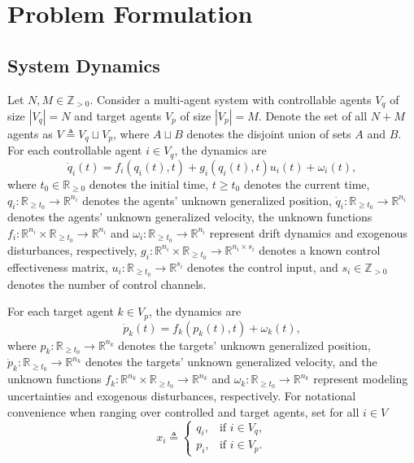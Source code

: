 \documentclass[letterpaper, 10 pt, conference]{ieeeconf}
\theoremstyle{definition}
\begin{document}
\section{Problem Formulation}

\subsection{System Dynamics}
Let $N,M\in\mathbb{Z}_{>0}$. Consider a multi-agent system with controllable agents $V_q$ of size $|V_q|=N$ and target agents $V_p$ of size $|V_p|=M$. Denote the set of all $N+M$ agents as $V\triangleq V_q\sqcup V_p$, where $A\sqcup B$ denotes the disjoint union of sets $A$ and $B$.
For each controllable agent $i\in V_q$, the dynamics are
\begin{equation}
\dot{q}_{i}(t)=f_{i}\left(q_{i}(t),t\right)+g_{i}\left(q_{i}(t),t\right)u_{i}\left(t\right)+\omega_{i}\left(t\right),\label{eq:Agent Dynamics}
\end{equation}
where $t_0\in\mathbb{R}_{\geq0}$ denotes the initial time, $t\geq t_0$ denotes the current time, $q_i:\mathbb{R}_{\geq t_0}\to\mathbb{R}^{n_i}$ denotes the agents' unknown generalized position, $\dot{q}_i:\mathbb{R}_{\geq t_0}\to\mathbb{R}^{n_i}$ denotes the agents' unknown generalized velocity, the unknown functions
$f_{i}:\mathbb{R}^{n_i}\times\mathbb{R}_{\geq t_0}\to\mathbb{R}^{n_i}$ and
$\omega_{i}:\mathbb{R}_{\geq t_0}\to\mathbb{R}^{n_i}$ represent drift dynamics and exogenous disturbances, respectively, $g_{i}:\mathbb{R}^{n_i}\times\mathbb{R}_{\geq t_0}\to\mathbb{R}^{n_i\times s_{i}}$ denotes a known control effectiveness matrix, $u_{i}:\mathbb{R}_{\geq t_0}\to\mathbb{R}^{s_{i}}$ denotes the control input, and $s_{i}\in\mathbb{Z}_{>0}$ denotes the number of control channels.

For each target agent $k\in V_p$, the dynamics are
\begin{equation}
\dot{p}_k(t)=f_k\left(p_{k}(t),t\right)+\omega_{k}\left(t\right),\label{eq:Target Dynamics}
\end{equation}
where $p_k:\mathbb{R}_{\geq t_0}\to\mathbb{R}^{n_k}$ denotes the targets' unknown generalized position, $\dot{p}_k:\mathbb{R}_{\geq t_0}\to\mathbb{R}^{n_k}$ denotes the targets' unknown generalized velocity, and the unknown functions
$f_{k}:\mathbb{R}^{n_k}\times\mathbb{R}_{\geq t_0}\to\mathbb{R}^{n_k}$ and
$\omega_{k}:\mathbb{R}_{\geq t_0}\to\mathbb{R}^{n_k}$ represent modeling
uncertainties and exogenous disturbances, respectively. 
For notational convenience when ranging over controlled and target agents, set for all $i\in V$
\[
x_i\triangleq \begin{cases}
    q_i, & \text{if }i\in V_q,\\
    p_i, & \text{if }i\in V_p.
\end{cases}
\]
\end{document}
